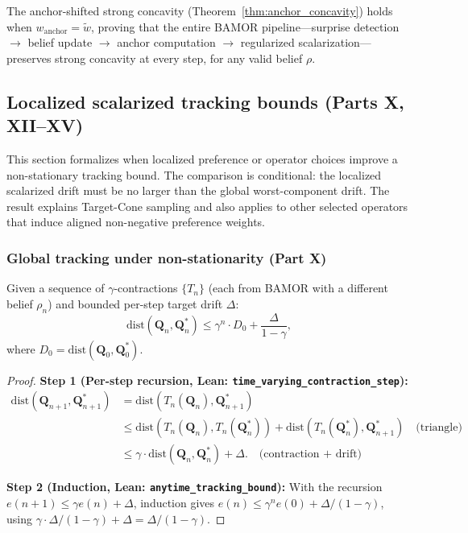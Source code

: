 \begin{theorem}
The anchor-shifted strong concavity (Theorem~\ref{thm:anchor_concavity}) holds when $w_{\mathrm{anchor}} = \tilde{w}$, proving that the entire BAMOR pipeline---surprise detection $\to$ belief update $\to$ anchor computation $\to$ regularized scalarization---preserves strong concavity at every step, for any valid belief $\rho$.
\end{theorem}


\subsection{Localized scalarized tracking bounds (Parts X, XII--XV)}
\label{sec:tracking}

This section formalizes when localized preference or operator choices improve a non-stationary tracking bound.  The comparison is conditional: the localized scalarized drift must be no larger than the global worst-component drift.  The result explains Target-Cone sampling and also applies to other selected operators that induce aligned non-negative preference weights.

\subsubsection{Global tracking under non-stationarity (Part X)}

\begin{theorem}
\label{thm:robust_tracking}
Given a sequence of $\gamma$-contractions $\{T_n\}$ (each from BAMOR with a different belief $\rho_n$) and bounded per-step target drift $\Delta$:
\begin{equation}
    \mathrm{dist}(\mathbf{Q}_n, \mathbf{Q}^*_n) \le \gamma^n \cdot D_0 + \frac{\Delta}{1 - \gamma},
    \label{eq:global_tracking}
\end{equation}
where $D_0 = \mathrm{dist}(\mathbf{Q}_0, \mathbf{Q}^*_0)$.
\end{theorem}

\begin{proof}
\textbf{Step 1 (Per-step recursion, Lean: \texttt{time\_varying\_contraction\_step}):}
\begin{align}
    \mathrm{dist}(\mathbf{Q}_{n+1}, \mathbf{Q}^*_{n+1}) &= \mathrm{dist}(T_n(\mathbf{Q}_n), \mathbf{Q}^*_{n+1}) \\
    &\le \mathrm{dist}(T_n(\mathbf{Q}_n), T_n(\mathbf{Q}^*_n)) + \mathrm{dist}(T_n(\mathbf{Q}^*_n), \mathbf{Q}^*_{n+1}) \quad \text{(triangle)} \\
    &\le \gamma \cdot \mathrm{dist}(\mathbf{Q}_n, \mathbf{Q}^*_n) + \Delta. \quad \text{(contraction + drift)}
\end{align}

\textbf{Step 2 (Induction, Lean: \texttt{anytime\_tracking\_bound}):} With the recursion $e(n+1) \le \gamma e(n) + \Delta$, induction gives $e(n) \le \gamma^n e(0) + \Delta/(1{-}\gamma)$, using $\gamma \cdot \Delta/(1{-}\gamma) + \Delta = \Delta/(1{-}\gamma)$.
\end{proof}

